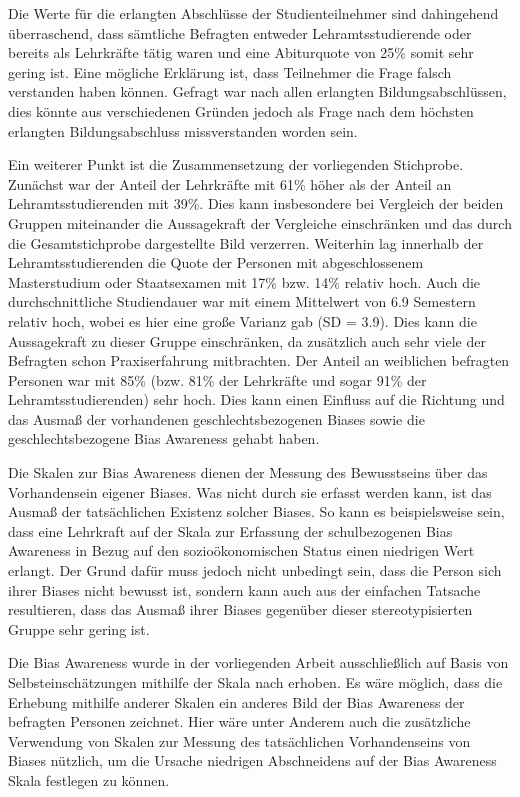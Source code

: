 Die Werte für die erlangten Abschlüsse der Studienteilnehmer sind dahingehend überraschend, dass sämtliche Befragten entweder Lehramtsstudierende oder bereits als Lehrkräfte tätig waren und eine Abiturquote von 25\% somit sehr gering ist.
Eine mögliche Erklärung ist, dass Teilnehmer die Frage falsch verstanden haben können.
Gefragt war nach allen erlangten Bildungsabschlüssen, dies könnte aus verschiedenen Gründen jedoch als Frage nach dem höchsten erlangten Bildungsabschluss missverstanden worden sein.

Ein weiterer Punkt ist die Zusammensetzung der vorliegenden Stichprobe.
Zunächst war der Anteil der Lehrkräfte mit 61\% höher als der Anteil an Lehramtsstudierenden mit 39\%.
Dies kann insbesondere bei Vergleich der beiden Gruppen miteinander die Aussagekraft der Vergleiche einschränken und das durch die Gesamtstichprobe dargestellte Bild verzerren.
Weiterhin lag innerhalb der Lehramtsstudierenden die Quote der Personen mit abgeschlossenem Masterstudium oder Staatsexamen mit 17\% bzw. 14\% relativ hoch.
Auch die durchschnittliche Studiendauer war mit einem Mittelwert von 6.9 Semestern relativ hoch, wobei es hier eine große Varianz gab (SD = 3.9).
Dies kann die Aussagekraft zu dieser Gruppe einschränken, da zusätzlich auch sehr viele der Befragten schon Praxiserfahrung mitbrachten.
Der Anteil an weiblichen befragten Personen war mit 85\% (bzw. 81\% der Lehrkräfte und sogar 91\% der Lehramtsstudierenden) sehr hoch.
Dies kann einen Einfluss auf die Richtung und das Ausmaß der vorhandenen geschlechtsbezogenen Biases sowie die geschlechtsbezogene Bias Awareness gehabt haben.

Die Skalen zur Bias Awareness dienen der Messung des Bewusstseins über das Vorhandensein eigener Biases.
Was nicht durch sie erfasst werden kann, ist das Ausmaß der tatsächlichen Existenz solcher Biases.
So kann es beispielsweise sein, dass eine Lehrkraft auf der Skala zur Erfassung der schulbezogenen Bias Awareness in Bezug auf den sozioökonomischen Status einen niedrigen Wert erlangt.
Der Grund dafür muss jedoch nicht unbedingt sein, dass die Person sich ihrer Biases nicht bewusst ist, sondern kann auch aus der einfachen Tatsache resultieren, dass das Ausmaß ihrer Biases gegenüber dieser stereotypisierten Gruppe sehr gering ist.

Die Bias Awareness wurde in der vorliegenden Arbeit ausschließlich auf Basis von Selbsteinschätzungen mithilfe der Skala nach \citet{perry2015modern} erhoben.
Es wäre möglich, dass die Erhebung mithilfe anderer Skalen ein anderes Bild der Bias Awareness der befragten Personen zeichnet.
Hier wäre unter Anderem auch die zusätzliche Verwendung von Skalen zur Messung des tatsächlichen Vorhandenseins von Biases nützlich, um die Ursache niedrigen Abschneidens auf der Bias Awareness Skala festlegen zu können.

